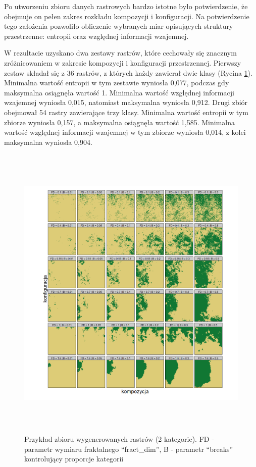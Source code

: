 \documentclass{amuthesis}
\begin{document}
Po utworzeniu zbioru danych rastrowych bardzo istotne było
potwierdzenie, że obejmuje on pełen zakres rozkładu kompozycji i
konfiguracji. Na potwierdzenie tego założenia pozwoliło obliczenie
wybranych miar opisujących struktury przestrzenne: entropii oraz
względnej informacji wzajemnej.

W rezultacie uzyskano dwa zestawy rastrów, które cechowały się znacznym
zróżnicowaniem w zakresie kompozycji i konfiguracji przestrzennej.
Pierwszy zestaw składał się z 36 rastrów, z których każdy zawierał dwie
klasy (Rycina \ref{fig-wykres1_2classes}). Minimalna wartość entropii w
tym zestawie wyniosła 0,077, podczas gdy maksymalna osiągnęła wartość 1.
Minimalna wartość względnej informacji wzajemnej wyniosła 0,015,
natomiast maksymalna wyniosła 0,912. Drugi zbiór obejmował 54 rastry
zawierające trzy klasy. Minimalna wartość entropii w tym zbiorze
wyniosła 0,157, a maksymalna osiągnęła wartość 1,585. Minimalna wartość
względnej informacji wzajemnej w tym zbiorze wyniosła 0,014, z kolei
maksymalna wyniosła 0,904.

\begin{figure}[t]

{\centering \includegraphics[width=5.72917in,height=5.72917in]{figures/wykres1_2classes.png}

}

\caption{\label{fig-wykres1_2classes}Przykład zbioru wygenerowanych
rastrów (2 kategorie). FD - parametr wymiaru fraktalnego ``fract\_dim'',
B - parametr ``breaks'' kontrolujący proporcje kategorii}

\end{figure}
\end{document}
